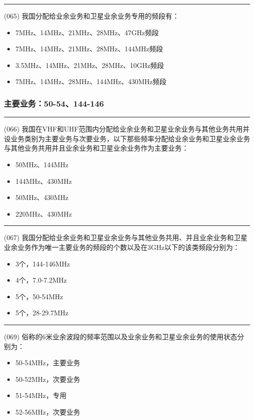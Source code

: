 \documentclass[twocolumn,hyperref,UTF8]{ctexart}  %
\begin{document}
\noindent\rule{0.5\textwidth}{1pt}
\heiti (065) 我国分配给业余业务和卫星业余业务{\color{cyan}专用}的频段有： \songti {\color{gray} [LK0144] }
\begin{itemize}
	\item  {\color{LimeGreen}7MHz、14MHz、21MHz、28MHz、47GHz频段}
	\item  7MHz、14MHz、21MHz、28MHz、144MHz频段
	\item  3.5MHz、14MHz、21MHz、28MHz、10GHz频段
	\item  7MHz、14MHz、28MHz、144MHz、430MHz频段
\end{itemize}


\vspace{12pt}
\subsubsection{主要业务：50-54、144-146}


\noindent\rule{0.5\textwidth}{1pt}
\heiti (066) 我国在VHF和UHF范围内分配给业余业务和卫星业余业务与其他业务共用并设业务类别为主要业务与次要业务，以下那些频率分配给业余业务和卫星业余业务与其他业务共用并且业余业务和卫星业余业务{\color{cyan}作为主要业务}：  \songti {\color{gray} [LK0146] }
\begin{itemize}
	\item  {\color{LimeGreen}50MHz、144MHz}
	\item  144MHz、430MHz
	\item  50MHz、430MHz
	\item  220MHz、430MHz
\end{itemize}


\noindent\rule{0.5\textwidth}{1pt}
\heiti (067) 我国分配给业余业务和卫星业余业务与其他业务共用、并且业余业务和卫星业余业务{\color{cyan}作为唯一主要业务}的频段的个数以及在3GHz以下的该类频段分别为： \songti {\color{gray} [LK0147] }
\begin{itemize}
	\item  {\color{LimeGreen}3个}，{\color{LimeGreen}144-146MHz}
	\item  4个，7.0-7.2MHz
	\item  {\color{red}5个}，50-54MHz
	\item  5个，28-29.7MHz
\end{itemize}


\noindent\rule{0.5\textwidth}{1pt}
\heiti (069) 俗称的6米业余波段的频率范围以及业余业务和卫星业余业务的使用状态分别为： \songti {\color{gray} [LK0157] }
\begin{itemize}
	\item  50-54MHz，{\color{LimeGreen}主要业务}
	\item  50-52MHz，次要业务
	\item  51-54MHz，专用
	\item  52-56MHz，次要业务
\end{itemize}
\end{document}
